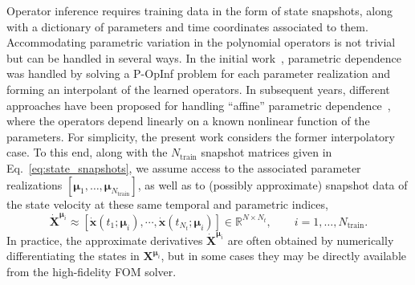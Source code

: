 \documentclass[3p,computermodern,11pt]{elsarticle}
\numberwithin{equation}{section}
\newcommand{\inputs}{\boldsymbol u}
\newcommand{\nInputs}{n_{\mathrm{inputs}}}
\newcommand{\snapshotsInputs}{\mathbf{U}}
\newcommand{\nt}{N_t}
\newcommand{\snapshotsState}{\mathbf{X}}
\newcommand{\state}{\boldsymbol x}
\newcommand{\params}{\boldsymbol \mu}
\newcommand{\RR}[1]{\mathbb{R}^{#1}}
\newcommand{\fomDim}{N}
\newcommand{\nTrain}{N_{\text{train}}}
\begin{document}
Operator inference requires training data in the form of state snapshots, along with a dictionary of parameters and time coordinates associated to them. Accommodating parametric variation in the polynomial operators is not trivial but can be handled in several ways. In the initial work~\cite{PeWi16}, parametric dependence was handled by solving a P-OpInf problem for each parameter realization and forming an interpolant of the learned operators. In subsequent years, different approaches have been proposed for handling ``affine'' parametric dependence~\cite{McKhWi23,GoBeKa21,ViMcGr25}, where the operators depend linearly on a known nonlinear function of the parameters. For simplicity, the present work considers the former interpolatory case. To this end, along with the $\nTrain$ snapshot matrices 
given in Eq.~\eqref{eq:state_snapshots}, we assume access to the associated parameter realizations
$\left[\params_1,\ldots,\params_{\nTrain} \right]$,
as well as to (possibly approximate) snapshot data of the state velocity at these same temporal and parametric indices, 
$$\dot{\snapshotsState}^{\params_i} \approx  \left[ \dot{\state}(t_1;\params_i), \cdots, \dot{\state}(t_{\nt};\params_{i}) \right] \in \RR{\fomDim \times \nt}, \qquad i=1,\ldots,\nTrain.$$
In practice, the approximate derivatives $\dot{\snapshotsState}^{\params_i}$ are often obtained by numerically differentiating the states in $\snapshotsState^{\params_i}$, but in some cases they may be directly available from the high-fidelity FOM solver.
 
\end{document}
